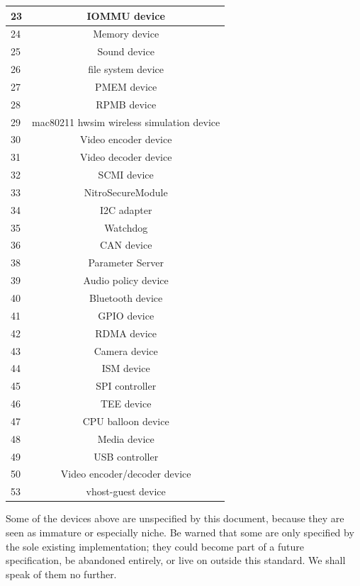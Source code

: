 \begin{longtable} { |l|c| }
\hline
23         &   IOMMU device \\
\hline
24         &   Memory device \\
\hline
25         &   Sound device \\
\hline
26         &   file system device \\
\hline
27         &   PMEM device \\
\hline
28         &   RPMB device \\
\hline
29         &   mac80211 hwsim wireless simulation device \\
\hline
30         &   Video encoder device \\
\hline
31         &   Video decoder device \\
\hline
32         &   SCMI device \\
\hline
33         &   NitroSecureModule \\
\hline
34         &   I2C adapter \\
\hline
35         &   Watchdog \\
\hline
36         &   CAN device \\
\hline
38         &   Parameter Server \\
\hline
39         &   Audio policy device \\
\hline
40         &   Bluetooth device \\
\hline
41         &   GPIO device \\
\hline
42         &   RDMA device \\
\hline
43         &   Camera device \\
\hline
44         &   ISM device \\
\hline
45         &   SPI controller \\
\hline
46         &   TEE device \\
\hline
47         &   CPU balloon device \\
\hline
48         &   Media device \\
\hline
49         &   USB controller \\
\hline
50         &   Video encoder/decoder device \\
\hline
53         &   vhost-guest device \\
\hline
\end{longtable}

Some of the devices above are unspecified by this document,
because they are seen as immature or especially niche.  Be warned
that some are only specified by the sole existing implementation;
they could become part of a future specification, be abandoned
entirely, or live on outside this standard.  We shall speak of
them no further.

